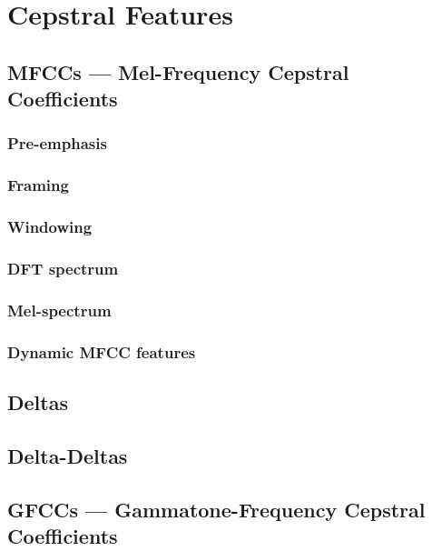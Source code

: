 \subsubsection{}


\section{Cepstral Features}
\subsection{MFCCs --- Mel-Frequency Cepstral Coefficients}

\subsubsection{Pre-emphasis}
\subsubsection{Framing}
\subsubsection{Windowing}
\subsubsection{DFT spectrum}
\subsubsection{Mel-spectrum}
\subsubsection{Dynamic MFCC features}


\subsection{Deltas}
\subsection{Delta-Deltas}

\subsection{GFCCs --- Gammatone-Frequency Cepstral Coefficients}
